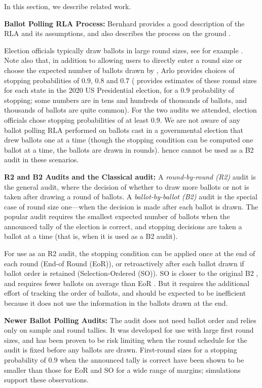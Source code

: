 In this section, we describe related work. 

{\bf Ballot Polling RLA Process:} Bernhard provides a good description of the RLA and its assumptions, and also describes the process on the ground \cite{bernhard-sok}. 

Election officials typically draw ballots in large round sizes, see for example \cite{va-2022,RI-report}. Note also that, in addition to allowing users to directly enter a round size or choose the expected number of ballots drawn by \BRAVO, Arlo provides choices of stopping probabilities of $0.9$, $0.8$ and $0.7$ (\cite{usenix_minerva} provides estimates of these round sizes for each state in the 2020 US Presidential election, for a $0.9$ probability of stopping; some numbers are in tens and hundreds of thousands of ballots, and thousands of ballots are quite common). For the two audits we attended, election officials chose stopping probabilities of at least $0.9$. We are not aware of any ballot polling RLA performed on ballots cast in a governmental election that drew ballots one at a time (though the stopping condition can be computed one ballot at a time, the ballots are drawn in rounds). \BRAVO hence cannot be used as a B2 audit in these scenarios. 

{\bf R2 and B2 Audits and the Classical \BRAVO audit:} A {\em round-by-round (R2)} audit is the general audit, where the decision of whether to draw more ballots or not is taken after drawing a round of ballots. A {\em ballot-by-ballot (B2)} audit is the special case of round size one---when the decision is made after each ballot is drawn. The popular \BRAVO audit requires the smallest expected number of ballots when the announced tally of the election is correct, and stopping decisions are taken a ballot at a time (that is, when it is used as a B2 audit). 

For use as an R2 audit, the \BRAVO stopping condition can be applied once at the end of each round (End-of Round (EoR)), or retroactively after each ballot drawn if ballot order is retained (Selection-Ordered (SO)). SO \BRAVO is closer to the original B2 \BRAVO, and requires fewer ballots on average than EoR \BRAVO. But it requires the additional effort of tracking the order of ballots, and should be expected to be inefficient because it does not use the information in the ballots drawn at the end. 

{\bf Newer Ballot Polling Audits:} The \Minerva audit \cite{usenix_minerva,arxiv_athena} does not need ballot order and relies only on sample and round tallies. It was developed for use with large first round sizes, and has been proven to be risk limiting when the round schedule for the audit is fixed before any ballots are drawn. First-round sizes for a stopping probability of $0.9$ when the announced tally is correct have been shown to be smaller than those for EoR and SO \BRAVO for a wide range of margins; simulations \cite{arxiv_athena} support these observations. 

